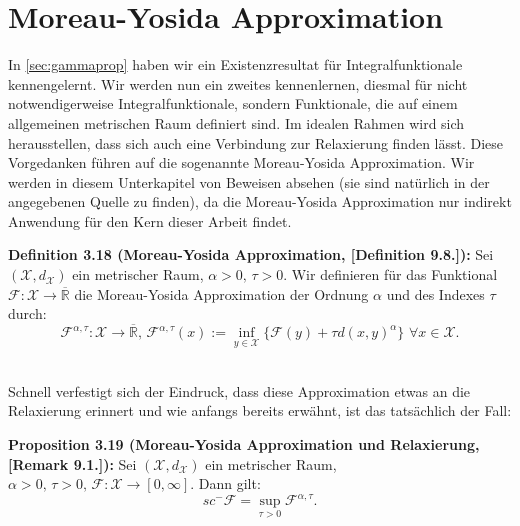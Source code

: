 \section{Moreau-Yosida Approximation}{\label{sec:moryos}}
In \ref{sec:gammaprop} haben wir ein Existenzresultat für Integralfunktionale kennengelernt. Wir werden nun ein zweites kennenlernen, diesmal für nicht notwendigerweise Integralfunktionale, sondern Funktionale, die auf einem allgemeinen metrischen Raum definiert sind. Im idealen Rahmen wird sich herausstellen, dass sich auch eine Verbindung zur Relaxierung finden lässt. Diese Vorgedanken führen auf die sogenannte Moreau-Yosida Approximation. Wir werden in diesem Unterkapitel von Beweisen absehen (sie sind natürlich in der angegebenen Quelle zu finden), da die Moreau-Yosida Approximation nur indirekt Anwendung für den Kern dieser Arbeit findet.\\[0.5cm]
\colorbox{generalYellow}{\begin{minipage}{16cm}{\textcolor{black}{}{\label{def3.18}}}
\textbf{Definition 3.18 (Moreau-Yosida Approximation, \cite{MasoGamma}[Definition 9.8.]):} Sei \((\mathcal{X},d_{\mathcal{X}})\) ein metrischer Raum, \(\alpha > 0, \, \tau > 0\). Wir definieren für das Funktional \(\mathcal{F} : \mathcal{X} \to \overline{\mathbb{R}}\) die Moreau-Yosida Approximation der Ordnung \(\alpha\) und des Indexes \(\tau\) durch:
\begin{equation}
    \mathcal{F}^{\alpha,\tau} : \mathcal{X} \to \overline{\mathbb{R}}, \, \mathcal{F}^{\alpha, \tau}(x) := \inf_{y \in \mathcal{X}} \{\mathcal{F}(y) + \tau d(x,y)^{\alpha}\} \, \, \forall x \in \mathcal{X}.
\end{equation}
\end{minipage}}\\

Schnell verfestigt sich der Eindruck, dass diese Approximation etwas an die Relaxierung erinnert und wie anfangs bereits erwähnt, ist das tatsächlich der Fall:\\[0.5cm]
\colorbox{generalYellow}{\begin{minipage}{16cm}{\textcolor{black}{}{\label{prop3.19}}}
\textbf{Proposition 3.19 (Moreau-Yosida Approximation und Relaxierung, \cite{MasoGamma}[Remark 9.1.]):} Sei \((\mathcal{X},d_{\mathcal{X}})\) ein metrischer Raum, \(\alpha > 0, \, \tau > 0, \, \mathcal{F} : \mathcal{X} \to [0,\infty]\). Dann gilt:
\begin{equation}
    sc^- \mathcal{F} = \sup_{\tau > 0} \mathcal{F}^{\alpha, \tau}.
\end{equation}
\end{minipage}}

